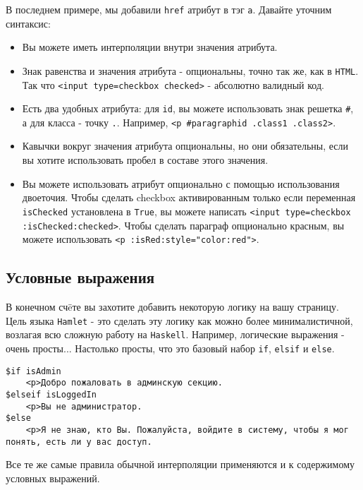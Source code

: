 В последнем примере, мы добавили \texttt{href} атрибут в тэг \texttt{a}.
Давайте уточним синтаксис:

\begin{itemize}
    \item Вы можете иметь интерполяции внутри значения атрибута.
    \item Знак равенства и значения атрибута - опциональны, точно так же, как в
        \texttt{HTML}.  Так что \lstinline!<input type=checkbox checked>! -
        абсолютно валидный код.
    \item Есть два удобных атрибута: для \lstinline!id!, вы можете использовать
        знак решетка \texttt{\#}, а для класса - точку \texttt{.}. Например,
        \lstinline!<p #paragraphid .class1 .class2>!.
    \item Кавычки вокруг значения атрибута опциональны, но они обязательны,
        если вы хотите использовать пробел в составе этого значения.
    \item Вы можете использовать атрибут опционально с помощью использования
        двоеточия.  Чтобы сделать checkbox активированным только если
        переменная \lstinline!isChecked!  установлена в \lstinline!True!, вы
        можете написать
        \lstinline!<input type=checkbox :isChecked:checked>!.  Чтобы сделать
        параграф опционально красным, вы можете использовать
        \lstinline!<p :isRed:style="color:red">!.
\end{itemize}


\subsection{Условные выражения}

В конечном счëте вы захотите добавить некоторую логику на вашу страницу. Цель
языка \texttt{Hamlet} - это сделать эту логику как можно более минималистичной,
возлагая всю сложную работу на \texttt{Haskell}. Например, логические выражения
- очень просты...  Настолько просты, что это базовый набор \texttt{if},
\texttt{elsif} и \texttt{else}.

\begin{lstlisting}
$if isAdmin
    <p>Добро пожаловать в админскую секцию.
$elseif isLoggedIn
    <p>Вы не администратор.
$else
    <p>Я не знаю, кто Вы. Пожалуйста, войдите в систему, чтобы я мог понять, есть ли у вас доступ.
\end{lstlisting}

Все те же самые правила обычной интерполяции применяются и к содержимому
условных выражений.

